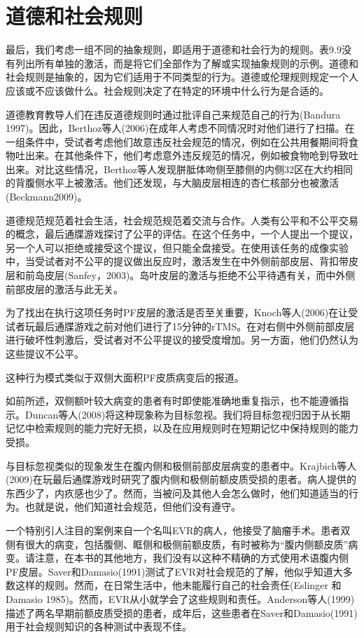 \section{道德和社会规则}

最后，我们考虑一组不同的抽象规则，即适用于道德和社会行为的规则。表9.9没有列出所有单独的激活，而是将它们全部作为了解或实现抽象规则的示例。道德和社会规则是抽象的，因为它们适用于不同类型的行为。道德或伦理规则规定一个人应该或不应该做什么。社会规则决定了在特定的环境中什么行为是合适的。

道德教育教导人们在违反道德规则时通过批评自己来规范自己的行为(Bandura 1997)。因此，Berthoz等人(2006)在成年人考虑不同情况时对他们进行了扫描。在一组条件中，受试者考虑他们故意违反社会规范的情况，例如在公共用餐期间将食物吐出来。在其他条件下，他们考虑意外违反规范的情况，例如被食物呛到导致吐出来。对比这些情况，Berthoz等人发现胼胝体吻侧至膝侧的内侧32区在大约相同的背腹侧水平上被激活。他们还发现，与大脑皮层相连的杏仁核部分也被激活(Beckmann2009)。

道德规范规范着社会生活，社会规范规范着交流与合作。人类有公平和不公平交易的概念，最后通牒游戏探讨了公平的评估。在这个任务中，一个人提出一个提议，另一个人可以拒绝或接受这个提议，但只能全盘接受。在使用该任务的成像实验中，当受试者对不公平的提议做出反应时，激活发生在中外侧前部皮层、背扣带皮层和前岛皮层(Sanfey，2003)。岛叶皮层的激活与拒绝不公平待遇有关，而中外侧前部皮层的激活与此无关。

为了找出在执行这项任务时PF皮层的激活是否至关重要，Knoch等人(2006)在让受试者玩最后通牒游戏之前对他们进行了15分钟的rTMS。在对右侧中外侧前部皮层进行破坏性刺激后，受试者对不公平提议的接受度增加。另一方面，他们仍然认为这些提议不公平。

这种行为模式类似于双侧大面积PF皮质病变后的报道。

如前所述，双侧额叶较大病变的患者有时即使能准确地重复指示，也不能遵循指示。Duncan等人(2008)将这种现象称为目标忽视。我们将目标忽视归因于从长期记忆中检索规则的能力完好无损，以及在应用规则时在短期记忆中保持规则的能力受损。

与目标忽视类似的现象发生在腹内侧和极侧前部皮层病变的患者中。Krajbich等人(2009)在玩最后通牒游戏时研究了腹内侧和极侧前额皮质受损的患者。病人提供的东西少了，内疚感也少了。然而，当被问及其他人会怎么做时，他们知道适当的行为。也就是说，他们知道社会规范，但他们没有遵守。

一个特别引人注目的案例来自一个名叫EVR的病人，他接受了脑瘤手术。患者双侧有很大的病变，包括腹侧、眶侧和极侧前额皮质，有时被称为“腹内侧额皮质”病变。请注意，在本书的其他地方，我们没有以这种不精确的方式使用术语腹内侧PF皮层。Saver和Damasio(1991)测试了EVR对社会规范的了解，他似乎知道大多数这样的规则。然而，在日常生活中，他未能履行自己的社会责任(Eslinger 和 Damasio 1985)。然而，EVR从小就学会了这些规则和责任。Anderson等人(1999)描述了两名早期前额皮质受损的患者，成年后，这些患者在Saver和Damasio(1991)用于社会规则知识的各种测试中表现不佳。


